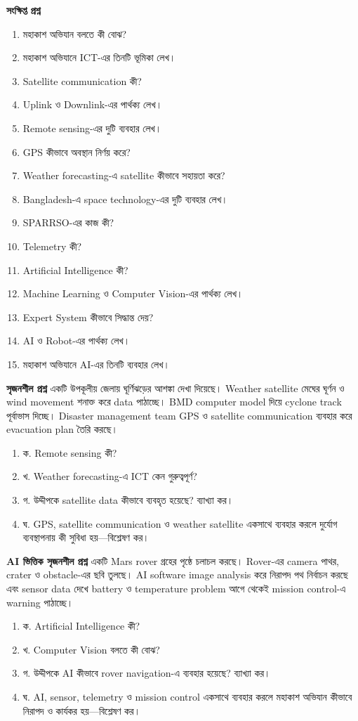 \begin{practicebox}
\textbf{সংক্ষিপ্ত প্রশ্ন}
\begin{enumerate}
\item মহাকাশ অভিযান বলতে কী বোঝ?
\item মহাকাশ অভিযানে ICT-এর তিনটি ভূমিকা লেখ।
\item Satellite communication কী?
\item Uplink ও Downlink-এর পার্থক্য লেখ।
\item Remote sensing-এর দুটি ব্যবহার লেখ।
\item GPS কীভাবে অবস্থান নির্ণয় করে?
\item Weather forecasting-এ satellite কীভাবে সহায়তা করে?
\item Bangladesh-এ space technology-এর দুটি ব্যবহার লেখ।
\item SPARRSO-এর কাজ কী?
\item Telemetry কী?
\item Artificial Intelligence কী?
\item Machine Learning ও Computer Vision-এর পার্থক্য লেখ।
\item Expert System কীভাবে সিদ্ধান্ত দেয়?
\item AI ও Robot-এর পার্থক্য লেখ।
\item মহাকাশ অভিযানে AI-এর তিনটি ব্যবহার লেখ।
\end{enumerate}

\textbf{সৃজনশীল প্রশ্ন}
একটি উপকূলীয় জেলায় ঘূর্ণিঝড়ের আশঙ্কা দেখা দিয়েছে। Weather satellite মেঘের ঘূর্ণন ও wind movement শনাক্ত করে data পাঠাচ্ছে। BMD computer model দিয়ে cyclone track পূর্বাভাস দিচ্ছে। Disaster management team GPS ও satellite communication ব্যবহার করে evacuation plan তৈরি করছে।

\begin{enumerate}
\item ক. Remote sensing কী?
\item খ. Weather forecasting-এ ICT কেন গুরুত্বপূর্ণ?
\item গ. উদ্দীপকে satellite data কীভাবে ব্যবহৃত হয়েছে? ব্যাখ্যা কর।
\item ঘ. GPS, satellite communication ও weather satellite একসাথে ব্যবহার করলে দুর্যোগ ব্যবস্থাপনায় কী সুবিধা হয়—বিশ্লেষণ কর।
\end{enumerate}

\textbf{AI ভিত্তিক সৃজনশীল প্রশ্ন}
একটি Mars rover গ্রহের পৃষ্ঠে চলাচল করছে। Rover-এর camera পাথর, crater ও obstacle-এর ছবি তুলছে। AI software image analysis করে নিরাপদ পথ নির্বাচন করছে এবং sensor data দেখে battery ও temperature problem আগে থেকেই mission control-এ warning পাঠাচ্ছে।

\begin{enumerate}
\item ক. Artificial Intelligence কী?
\item খ. Computer Vision বলতে কী বোঝ?
\item গ. উদ্দীপকে AI কীভাবে rover navigation-এ ব্যবহার হয়েছে? ব্যাখ্যা কর।
\item ঘ. AI, sensor, telemetry ও mission control একসাথে ব্যবহার করলে মহাকাশ অভিযান কীভাবে নিরাপদ ও কার্যকর হয়—বিশ্লেষণ কর।
\end{enumerate}
\end{practicebox}


